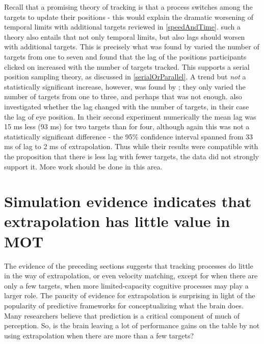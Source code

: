 \documentclass[
]{book}
\begin{document}
Recall that a promising theory of tracking is that a process switches among the targets to update their positions - this would explain the dramatic worsening of temporal limits with additional targets reviewed in \ref{speedAndTime}. such a theory also entails that not only temporal limits, but also lags should worsen with additional targets. This is precisely what was found by \citet{howardTrackingChangingFeatures2008} varied the number of targets from one to seven and found that the lag of the positions participants clicked on increased with the number of targets tracked. This supports a serial position sampling theory, as discussed in \ref{serialOrParallel}. A trend but \emph{not} a statistically significant increase, however, was found by \citet{howardPositionRepresentationsLag2011}; they only varied the number of targets from one to three, and perhaps that was not enough. \citet{lukavskyGazePositionLagging2016} also investigated whether the lag changed with the number of targets, in their case the lag of eye position. In their second experiment numerically the mean lag was 15 ms less (93 ms) for two targets than for four, although again this was not a statistically significant difference - the 95\% confidence interval spanned from 33 ms of lag to 2 ms of extrapolation. Thus while their results were compatible with the proposition that there is less lag with fewer targets, the data did not strongly support it. More work should be done in this area.

\hypertarget{simulation-evidence-indicates-that-extrapolation-has-little-value-in-mot}{%
\section{Simulation evidence indicates that extrapolation has little value in MOT}\label{simulation-evidence-indicates-that-extrapolation-has-little-value-in-mot}}

The evidence of the preceding sections suggests that tracking processes do little in the way of extrapolation, or even velocity matching, except for when there are only a few targets, when more limited-capacity cognitive processes may play a larger role. The paucity of evidence for extrapolation is surprising in light of the popularity of predictive frameworks for conceptualizing what the brain does. Many researchers believe that prediction is a critical component of much of perception. So, is the brain leaving a lot of performance gains on the table by not using extrapolation when there are more than a few targets?
\end{document}
